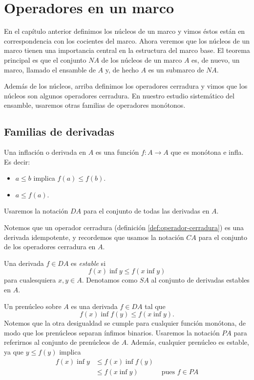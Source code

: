 \chapter{Operadores en un marco}



En el capítulo anterior definimos los núcleos de un marco y vimos
éstos están en correspondencia con los cocientes del marco.
Ahora veremos que los núcleos de un marco tienen una importancia
central en la estructura del marco base.
El teorema principal es que el conjunto $NA$ de los núcleos de un
marco $A$ es, de nuevo, un marco, llamado el
ensamble de $A$ y, de hecho $A$ es un submarco de $NA$.

Además de los núcleos, arriba definimos los operadores cerradura
y vimos que los núcleos son algunos operadores cerradura.
En nuestro estudio sistemático del ensamble, usaremos otras
familias de operadores monótonos.

\section{Familias de derivadas}

\begin{definition}[Derivadas]
  Una inflación o derivada en $A$ es una función $f:A\to A$ que
  es monótona e infla.
  Es decir:
  \begin{itemize}
    \item $a\leq b$ implica $f(a) \leq f(b)$.
    \item $a\leq f(a)$.
  \end{itemize}
  Usaremos la notación $DA$ para el conjunto de todas las
  derivadas en $A$.
\end{definition}
Notemos que un operador cerradura (definición
\ref{def:operador-cerradura}) es una derivada idempotente, y
recordemos que usamos la notación $CA$ para el conjunto de los 
operadores cerradura en $A$.

\begin{definition}
  Una derivada $f\in DA$ es \emph{estable} si
  \[
    f(x)\inf y \leq f(x\inf y)
  \]
  para cualesquiera $x,y\in A$.
  Denotamos como $SA$ al conjunto de derivadas estables en $A$.
\end{definition}

\begin{definition}[Prenúcleos]
  Un prenúcleo sobre $A$ es una derivada $f\in DA$ tal que
  \[
    f(x)\inf f(y) \leq f(x\inf y)
  .\]
  Notemos que la otra desigualdad se cumple para cualquier
  función monótona, de modo que los prenúcleos separan ínfimos
  binarios.
  Usaremos la notación $PA$ para referirnos al conjunto de
  prenúcleos de $A$.
  Además, cualquier prenúcleo es estable, ya que $y\leq f(y)$ implica
  \begin{align*}
    f(x) \inf y
    &\leq f(x) \inf f(y) \\
    &\leq f(x\inf y) & \text{ pues $f\in PA$}
  \end{align*}
\end{definition}

